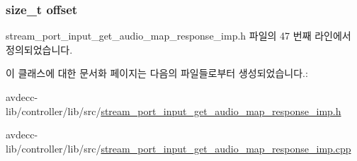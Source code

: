\subsubsection[{\texorpdfstring{offset}{offset}}]{\setlength{\rightskip}{0pt plus 5cm}size\+\_\+t offset\hspace{0.3cm}{\ttfamily [private]}}\hypertarget{classavdecc__lib_1_1stream__port__input__get__audio__map__response__imp_aadb6d6eb83e646653a1402032e45dcab}{}\label{classavdecc__lib_1_1stream__port__input__get__audio__map__response__imp_aadb6d6eb83e646653a1402032e45dcab}


stream\+\_\+port\+\_\+input\+\_\+get\+\_\+audio\+\_\+map\+\_\+response\+\_\+imp.\+h 파일의 47 번째 라인에서 정의되었습니다.



이 클래스에 대한 문서화 페이지는 다음의 파일들로부터 생성되었습니다.\+:\begin{DoxyCompactItemize}
\item 
avdecc-\/lib/controller/lib/src/\hyperlink{stream__port__input__get__audio__map__response__imp_8h}{stream\+\_\+port\+\_\+input\+\_\+get\+\_\+audio\+\_\+map\+\_\+response\+\_\+imp.\+h}\item 
avdecc-\/lib/controller/lib/src/\hyperlink{stream__port__input__get__audio__map__response__imp_8cpp}{stream\+\_\+port\+\_\+input\+\_\+get\+\_\+audio\+\_\+map\+\_\+response\+\_\+imp.\+cpp}\end{DoxyCompactItemize}
